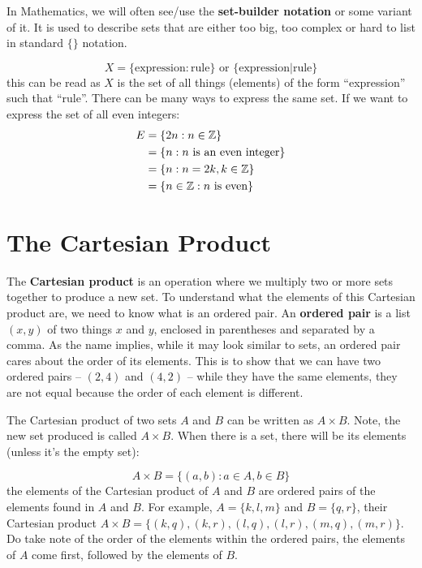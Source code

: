 \documentclass[../Latex-Setup/setup.tex]{subfiles}
\begin{document}
\indent In Mathematics, we will often see/use the \textbf{set-builder notation} or some variant of it.
It is used to describe sets that are either too big, too complex or hard to list in standard $\{\}$ notation.

\[X = \{\text{expression}:\text{rule}\} \text{ or } \{\text{expression}|\text{rule}\}\]
this can be read as $X$ is the set of all things (elements) of the form ``expression'' such that ``rule''.
There can be many ways to express the same set. If we want to express the set of all even integers:
\begin{align*}
    E &= \{2n: n \in \mathbb Z\} \\
    &= \{n: n \text{ is an even integer}\} \\
    &= \{n: n=2k,k \in \mathbb Z\} \\
    &= \{n \in \mathbb{Z} : n \text{ is even}\}
\end{align*}
\par


\section{The Cartesian Product}

\indent The \textbf{Cartesian product} is an operation where we multiply two or more sets together to produce a new set.
To understand what the elements of this Cartesian product are, we need to know what is an ordered pair.
An \textbf{ordered pair} is a list $(x,y)$ of two things $x$ and $y$, enclosed in parentheses and separated by a comma.
As the name implies, while it may look similar to sets, an ordered pair cares about the order of its elements.
This is to show that we can have two ordered pairs -- $(2,4)$ and $(4,2)$ -- while they have the same elements,
they are not equal because the order of each element is different.\par

\indent The Cartesian product of two sets $A$ and $B$ can be written as $A \times B$. Note, the new set produced is called $A \times B$.
When there is a set, there will be its elements (unless it's the empty set):

\[A \times B =\{(a, b) : a \in A, b \in B\}\]
the elements of the Cartesian product of $A$ and $B$ are ordered pairs of the elements found in $A$ and $B$. For example,
$A = \{k, l, m\}$ and $B = \{q, r\}$, their Cartesian product $A \times B = \{(k,q), (k,r), (l,q), (l,r), (m,q), (m,r)\}$.
Do take note of the order of the elements within the ordered pairs, the elements of $A$ come first, followed by the elements of $B$.\par
\end{document}
